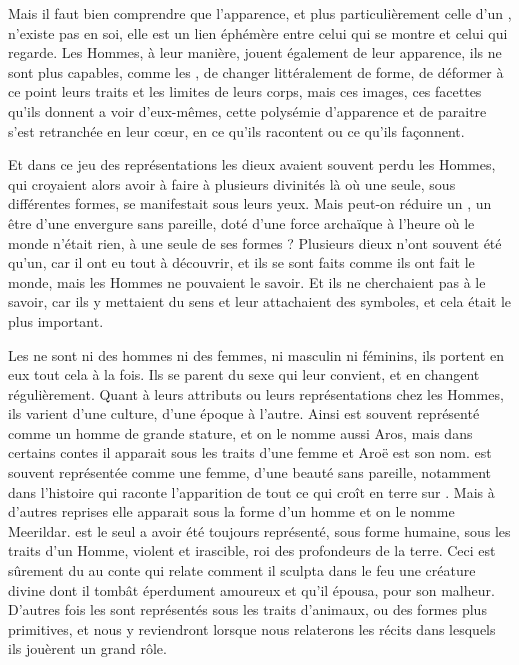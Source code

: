 Mais il faut bien comprendre que l’apparence, et plus particulièrement celle d'un \Ea, n’existe pas en soi, elle est un lien éphémère entre celui qui se montre et celui qui regarde. Les Hommes, à leur manière, jouent également de leur apparence, ils ne sont plus capables, comme les \Ea, de changer littéralement de forme, de déformer à ce point leurs traits et les limites de leurs corps, mais ces images, ces facettes qu’ils donnent a voir d’eux-mêmes, cette polysémie d’apparence et de paraitre s’est retranchée en leur cœur, en ce qu’ils racontent ou ce qu'ils façonnent.   

Et dans ce jeu des représentations les dieux avaient souvent perdu les Hommes, qui croyaient alors avoir à faire à plusieurs divinités là où une seule, sous différentes formes, se manifestait sous leurs yeux. Mais peut-on réduire un \Ea, un être d'une envergure sans pareille, doté d'une force archaïque à l'heure où le monde n'était rien, à une seule de ses formes ? Plusieurs dieux n'ont souvent été qu'un, car il ont eu tout à découvrir, et ils se sont faits comme ils ont fait le monde, mais les Hommes ne pouvaient le savoir. Et ils ne cherchaient pas à le savoir, car ils y mettaient du sens et leur attachaient des symboles, et cela était le plus important.

Les \Ea ne sont ni des hommes ni des femmes, ni masculin ni féminins, ils portent en eux tout cela à la fois. Ils se parent du sexe qui leur convient, et en changent régulièrement. Quant à leurs attributs ou leurs représentations chez les Hommes, ils varient d'une culture, d'une époque à l'autre. Ainsi \Oros est souvent représenté comme un homme de grande stature, et on le nomme aussi Aros, mais dans certains contes il apparait sous les traits d'une femme et Aroë est son nom. \Nio est souvent représentée comme une femme, d'une beauté sans pareille, notamment dans l'histoire qui raconte l'apparition de tout ce qui croît en terre sur \Orba. Mais à d'autres reprises elle apparait sous la forme d'un homme et on le nomme Meerildar. \Fercor est le seul \Ea a avoir été toujours représenté, sous forme humaine, sous les traits d'un Homme, violent et irascible, roi des profondeurs de la terre. Ceci est sûrement du au conte qui relate comment il sculpta dans le feu une créature divine dont il tombât éperdument amoureux et qu'il épousa, pour son malheur. D'autres fois les \Ea sont représentés sous les traits d'animaux, ou des formes plus primitives, et nous y reviendront lorsque nous relaterons les récits dans lesquels ils jouèrent un grand rôle.

